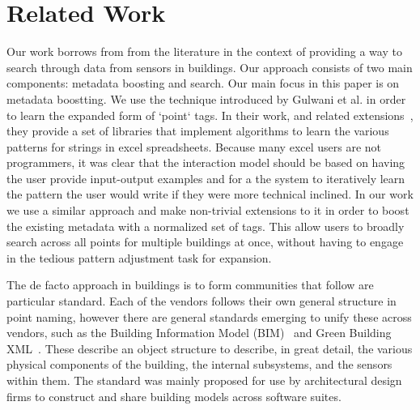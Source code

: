 \section{Related Work}

Our work borrows from from the literature in the context of providing a way to search
through data from sensors in buildings.  Our approach consists of two main components:
metadata boosting and search.  Our main focus in this paper is on metadata boostting.
We use the technique introduced by Gulwani et al.\cite{Gulwani:2011} in order to learn 
the expanded form of `point` tags.  In their work, and related extensions~\cite{Harris:2011,
Singh:2012,Gulwani12spreadsheetdata}, they provide a set of libraries that implement
algorithms to learn the various patterns for strings in excel spreadsheets.  Because many
excel users are not programmers, it was clear that the interaction model should be based
on having the user provide input-output examples and for a the system to iteratively learn
the pattern the user would write if they were more technical inclined.  In our work
we use a similar approach and make non-trivial extensions to it in order to boost the
existing metadata with a normalized set of tags.  This allow users to broadly search across
all points for multiple buildings at once, without having to engage in the tedious
pattern adjustment task for expansion.

The de facto approach in buildings is to form communities that follow are particular standard.
Each of the vendors follows their own general structure in point naming, however there
are general standards emerging to unify these across vendors, such as the Building
Information Model (BIM)~\cite{BIM} and Green Building XML~\cite{GBXML}.  These describe an 
object structure to describe, in great detail, the various physical components of the building,
the internal subsystems, and the sensors within them.  The standard was mainly proposed
for use by architectural design firms to construct and share building models across software
suites.  
